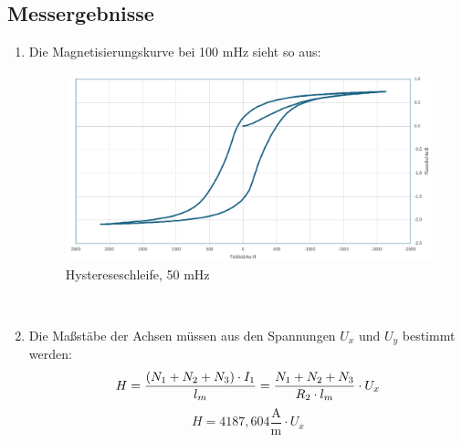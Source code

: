 \documentclass[a4paper,twoside,12pt,DIV=13,BCOR=5mm,numbers=noenddot,cleardoublepage=empty]{scrbook}
\begin{document}
    \newpage

    \subsection{Messergebnisse}

        \begin{enumerate}
            \item Die Magnetisierungskurve bei 100 mHz sieht so aus:

            \begin{figure}[h] 
            \centering
            \includegraphics[width=1\textwidth]{pictures/50mHz.png} 
            \caption{Hystereseschleife, 50 mHz}
            \label{fig:meinbild}
             \end{figure}

            \\

            \item
                Die Maßstäbe der Achsen müssen aus den Spannungen $U_x$ und $U_y$ bestimmt werden:
                \begin{equation}
                    H = \frac{(N_1 + N_2 + N_3) \cdot I_1}{l_m} \\
                    = \frac{N_1 + N_2 + N_3}{R_2 \cdot l_m} \cdot U_x \\
                \end{equation}
                \begin{equation}
                    H = 4187,604 \frac{\text{A}}{\text{m}} \cdot U_x
                \end{equation}


\end{enumerate}
\end{document}
